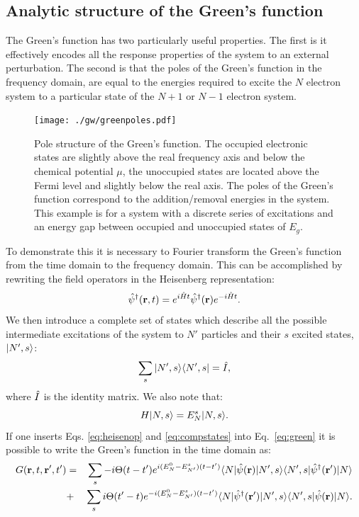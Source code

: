 \subsection{Analytic structure of the Green's function}
\noindent
The Green's function has two particularly useful properties. 
The first is it effectively encodes all the response properties of the 
system to an external perturbation. The second is that the 
poles of the Green's function in the frequency domain, are
equal to the energies required to excite the $N$ electron system to
a particular state of the $N+1$ or $N-1$ electron system.
%
\begin{figure}[tb]
\begin{center}
\texttt{[image: ./gw/greenpoles.pdf]}
\end{center}
\caption{\small \label{fig:greenpoles} Pole structure 
of the Green's function. The occupied electronic states are
slightly above the real frequency axis and below the chemical 
potential $\mu$, the unoccupied states are located above the Fermi
level and slightly below the real axis. The poles of the Green's 
function correspond to the addition/removal energies 
in the system. This example is for a system with a discrete series of 
excitations and an energy gap between occupied and unoccupied states
of $E_{g}$.}
\end{figure}
%
To demonstrate this it is necessary to Fourier transform the Green's function
from the time domain to the frequency domain. This can be accomplished by 
rewriting the field operators in the Heisenberg representation:
%
\begin{equation}
\label{eq:heisenop}
\hat{\psi}^{\dagger}({\bf r},t) = e^{i\hat{H}t}\hat{\psi}^{\dagger}({\bf r}) e^{-i\hat{H}t}.
\end{equation}
%
We then introduce a complete set of states which describe all the possible 
intermediate excitations of the system to $N'$ particles 
and their $s$ excited states,~$|N',s\rangle$:
%
\begin{equation}
\label{eq:compstates}
\sum_{s}|N', s\rangle \langle N',s| = \hat{I},
\end{equation}
%
where $\hat{I}$ is the identity matrix.
We also note that:
%
\begin{equation}
H|N,s\rangle = E^{s}_{N}|N,s\rangle.
\end{equation}
%
%
If one inserts Eqs. \ref{eq:heisenop} and \ref{eq:compstates} into Eq.~\ref{eq:green} it is possible 
to write the Green's function in the time domain as:
%
\begin{align}
\label{eq:grtimedom}
G({\bf r},t,{\bf r^\prime},t') & = & \sum_{s} -i\Theta(t-t') e^{i(E^{0}_{N} - E_{N'}^{s})(t-t')}\langle N|\hat{\psi}({\bf r})|N',s\rangle\langle N',s|\hat{\psi}^{\dagger}({\bf r}')|N\rangle \nonumber \\
	  &+ & \sum_{s} i\Theta(t'-t) e^{-i(E_{N}^{0} - E^{s}_{N'})(t-t')}\langle N|\hat{\psi}^{\dagger}({\bf r}') |N',s\rangle \langle N',s|\hat{\psi}({\bf r})| N \rangle.
\end{align}
